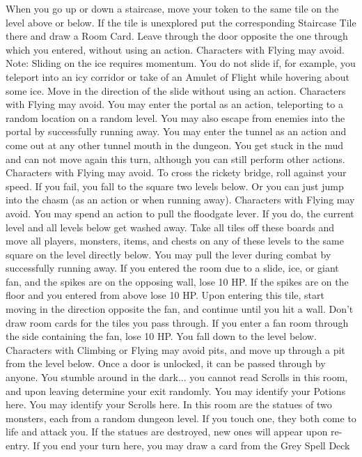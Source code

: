 \documentclass{book}
\begin{document}
\begin{itemize}
When you go up or down a staircase, move your token to the same tile on
the level above or below. If the tile is unexplored put the corresponding
Staircase Tile there and draw a Room Card.
Leave through the door opposite the one through which you entered,
without using an action. Characters with Flying may avoid. Note: Sliding
on the ice requires momentum. You do not slide if, for example, you
teleport into an icy corridor or take of an Amulet of Flight while hovering
about some ice.
Move in the direction of the slide without using an action. Characters
with Flying may avoid.
You may enter the portal as an action, teleporting to a random location
on a random level. You may also escape from enemies into the portal by
successfully running away.
You may enter the tunnel as an action and come out at any other tunnel
mouth in the dungeon.
You get stuck in the mud and can not move again this turn, although you
can still perform other actions. Characters with Flying may avoid.
To cross the rickety bridge, roll against your speed. If you fail, you fall
to the square two levels below. Or you can just jump into the chasm (as
an action or when running away). Characters with Flying may avoid.
You may spend an action to pull the floodgate lever. If you do, the
current level and all levels below get washed away. Take all tiles off
these boards and move all players, monsters, items, and chests on any of
these levels to the same square on the level directly below. You may pull
the lever during combat by successfully running away.
If you entered the room due to a slide, ice, or giant fan, and the spikes
are on the opposing wall, lose 10 HP. If the spikes are on the floor and
you entered from above lose 10 HP.
Upon entering this tile, start moving in the direction opposite the fan,
and continue until you hit a wall. Don’t draw room cards for the tiles you
pass through. If you enter a fan room through the side containing the
fan, lose 10 HP.
You fall down to the level below. Characters with Climbing or Flying may
avoid pits, and move up through a pit from the level below.
Once a door is unlocked, it can be passed through by anyone.
You stumble around in the dark... you cannot read Scrolls in this room,
and upon leaving determine your exit randomly.
You may identify your Potions here.
You may identify your Scrolls here.
In this room are the statues of two monsters, each from a random
dungeon level. If you touch one, they both come to life and attack you. If
the statues are destroyed, new ones will appear upon re-entry.
If you end your turn here, you may draw a card from the Grey Spell Deck

\end{itemize}
\end{document}
